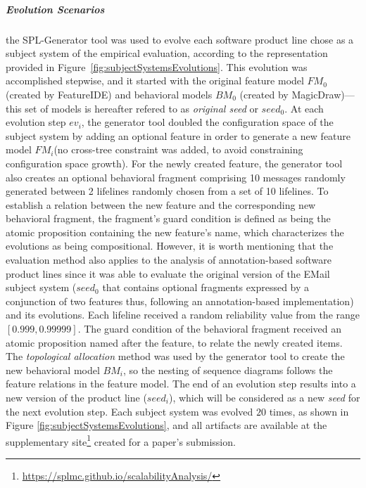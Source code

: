 \subparagraph*{Evolution Scenarios} the SPL-Generator tool was used to evolve
each software product line chose as a subject system of the empirical
evaluation, according to the representation provided in
Figure~\ref{fig:subjectSystemsEvolutions}. This evolution was accomplished
stepwise, and it started with the original feature model $FM_0$ (created by FeatureIDE)
and behavioral models $BM_0$ (created by MagicDraw)---this set of models is hereafter
refered to as \textit{original seed} or $seed_0$. At each evolution step $ev_i$,
the generator tool doubled the configuration space of the subject system by
adding an optional feature in order to generate a new feature model
$\mathit{FM}_i$(no cross-tree constraint was added, to avoid constraining
configuration space growth). For the newly created feature, the generator tool
also creates an optional behavioral fragment comprising 10 messages randomly
generated between 2 lifelines randomly chosen from a set of 10 lifelines.  To
establish a relation between the new feature and the corresponding new
behavioral fragment, the fragment's guard condition is defined as being the
atomic proposition containing the new feature's name, which characterizes the
evolutions as being compositional.  However, it is worth mentioning that the
evaluation method also applies to the analysis of annotation-based software
product lines since it was able to evaluate the original version of the EMail
subject system ($seed_0$ that contains optional fragments expressed by a
conjunction of two features thus, following an annotation-based implementation)
and its evolutions.  Each lifeline received a random reliability value from the
range $[0.999, 0.99999]$.  The guard condition of the behavioral fragment
received an atomic proposition named after the feature, to relate the newly
created items.  The \emph{topological allocation} method was used by the
generator tool to create the new behavioral model $BM_i$, so the nesting of
sequence diagrams follows the feature relations in the feature model. The end of
an evolution step results into a new version of the product line ($seed_i$),
which will be considered as a new \emph{seed} for the next evolution step.  Each
subject system was evolved $20$ times, as shown in Figure
\ref{fig:subjectSystemsEvolutions}, and all artifacts are available at the
supplementary site\footnote{\url{https://splmc.github.io/scalabilityAnalysis/}}
created for a paper's submission.

